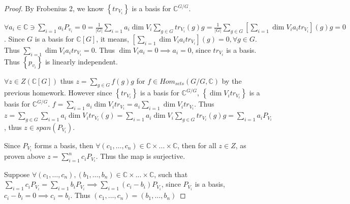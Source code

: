 \documentclass{article}
\newcommand{\C}{\mathbb{C}}
\begin{document}
\begin{proof}
    By Frobenius 2, we know $\left\{ tr_{V_i} \right\}$ is a basis for $\C^{G / G}$.
    
    $\forall a_i \in \C \ni \sum_{i = 1} a_i P_{v_i} = 0 = \frac{1}{|G|} \sum_{i = 1} a_i \dim V_i \sum_{g \in G} tr_{V_i}(g) g = \frac{1}{|G|} \sum_{g \in G}\left[ \sum_{i = 1} \dim V_i a_i tr_{V_i}\right](g) g = 0$. Since $G$ is a basis for $\C[G]$, it means, $\left[ \sum_{i = 1} \dim V_i a_i tr_{V_i}\right](g) = 0, \forall g \in G$. Thus $\sum_{i = 1} \dim V_i a_i tr_{V_i} = 0$. Thus $\dim V_i a_i = 0 \implies a_i = 0$, since $tr_{V_i}$ is a basis. Thus $\left\{ p_{v_i} \right\}$ is linearly independent. 

    $\forall z \in Z(\C[G])$ thus $z = \sum_{g \in G} f(g) g$ for $f \in Hom_{sets}(G / G, \C)$ by the previous homework. However since $\left\{ tr_{V_i} \right\}$ is a basis for $\C^{G / G}$, $\left\{ \dim V_i tr_{V_i} \right\}$ is a basis for $\C^{G / G}$. $f = \sum_{i = 1} a_i \dim V_i tr_{V_i} = a_i \sum_{i = 1} \dim V_i tr_{V_i}$. Thus $z = \sum_{g \in G} \sum_{i = 1} a_i \dim V_i tr_{V_i}(g) = \sum_{i = 1} a_i \dim V_i \sum_{g \in G} tr_{V_i}(g) g = \sum_{i = 1} a_i P_{V_i}$, thus $z \in span(P_{V_i})$.

    Since $P_{V_i}$ forms a basis, then $\forall (c_1, \dots, c_n) \in \C \times ... \times \C$, then for all $z \in Z$, as proven above $z = \sum_{i = 1}^{n} c_i P_{V_i}$. Thus the map is surjective. 
    
    Suppose $\forall (c_1, \dots, c_n), (b_1, \dots, b_n) \in \C \times ... \times \C$, such that $\sum_{i = 1} c_i P_{V_i} = \sum_{i = 1} b_i P_{V_i} \implies \sum_{i = 1}(c_i - b_i) P_{V_i}$, since $P_{V_i}$ is a basis, $c_i - b_i = 0 \implies c_i = b_i$. Thus $(c_1, \dots, c_n) =  (b_1, \dots, b_n)$     
\end{proof}
\end{document}
